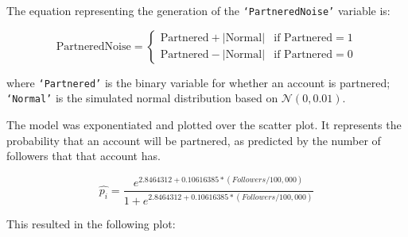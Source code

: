 \documentclass[12pt]{article}
\begin{document}
\noindent The equation representing the generation of the \texttt{`PartneredNoise'} variable is:

\begin{equation}
\text{PartneredNoise} = 
\begin{cases}
    \text{Partnered} + \lvert \text{Normal} \rvert & \text{if } \text{Partnered} = 1 \\
    \text{Partnered} - \lvert \text{Normal} \rvert & \text{if } \text{Partnered} = 0
\end{cases}
\end{equation}

\noindent where \texttt{`Partnered'} is the binary variable for whether an account is partnered; \texttt{`Normal'} is the simulated normal distribution based on $\mathcal{N}(0, 0.01)$.

The model was exponentiated and plotted over the scatter plot. It represents the probability that an account will be partnered, as predicted by the number of followers that that account has.

\begin{equation}
\hat{p_{i}} = \frac{e^{2.8464312 + 0.10616385 \ast (Followers/100,000)}}{1 + e^{2.8464312 + 0.10616385 \ast (Followers/100,000)}}
\end{equation}

This resulted in the following plot:
\end{document}
